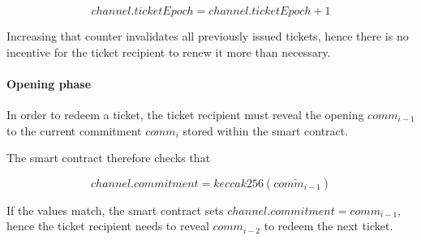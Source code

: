 $$ channel.ticketEpoch = channel.ticketEpoch + 1 $$

Increasing that counter invalidates all previously issued tickets, hence there is no incentive for the ticket recipient to renew it more than necessary.

\paragraph{Opening phase}

In order to redeem a ticket, the ticket recipient must reveal the opening $comm_{i-1}$ to the current commitment $comm_i$ stored within the smart contract.

The smart contract therefore checks that

$$ channel.commitment = keccak256 (\widetilde{comm_{i-1}}) $$

If the values match, the smart contract sets $channel.commitment = comm_{i-1}$, hence the ticket recipient needs to reveal $comm_{i-2}$ to redeem the next ticket.
